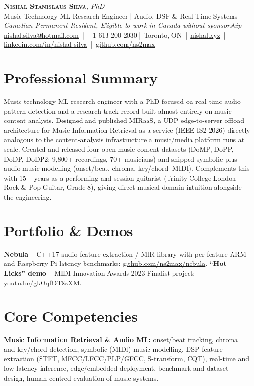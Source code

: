 \documentclass[11pt]{article}
\makeatletter
\newcommand{\cvName}{Nishal Stanislaus Silva}
\newcommand{\cvEmail}{nishal.silva@hotmail.com}
\newcommand{\cvPhone}{+1 613 200 2030}
\newcommand{\cvCity}{Toronto, ON}
\newcommand{\cvSite}{https://nishal.xyz}
\newcommand{\cvLinkedIn}{https://www.linkedin.com/in/nishal-silva}
\newcommand{\cvGitHub}{https://github.com/ns2max}
\newcommand{\cvStatus}{Canadian Permanent Resident, Eligible to work in Canada without sponsorship}
\newcommand{\cvTagline}{Music Technology ML Research Engineer | Audio, DSP \& Real-Time Systems}
\makeatother
\begin{document}
\pagestyle{empty}
\begin{center}
    {\LARGE \scshape \textbf{\cvName}}{\large \textit{, PhD}}\\[1pt]
    {\small \cvTagline}\\[1pt]
    {\footnotesize\textit{\cvStatus}}\\[1pt]
    {\small
    \href{mailto:\cvEmail}{\cvEmail} \,|\, \cvPhone \,|\, \cvCity
    \,|\, \href{\cvSite}{nishal.xyz} \,|\, \href{\cvLinkedIn}{linkedin.com/in/nishal-silva}
    \,|\, \href{\cvGitHub}{github.com/ns2max}}
\end{center}

\section*{Professional Summary}
Music technology ML research engineer with a PhD focused on real-time audio pattern detection and a research track record built almost entirely on music-content analysis. Designed and published MIRaaS, a UDP edge-to-server offload architecture for Music Information Retrieval as a service (IEEE IS2 2026) directly analogous to the content-analysis infrastructure a music/media platform runs at scale. Created and released four open music-content datasets (DoMP, DoPP, DoDP, DoDP2; 9,800+ recordings, 70+ musicians) and shipped symbolic-plus-audio music modelling (onset/beat, chroma, key/chord, MIDI). Complements this with 15+ years as a performing and session guitarist (Trinity College London Rock \& Pop Guitar, Grade 8), giving direct musical-domain intuition alongside the engineering.

\section*{Portfolio \& Demos}
\textbf{Nebula} -- C++17 audio-feature-extraction / MIR library with per-feature ARM and Raspberry Pi latency benchmarks: \href{https://github.com/ns2max/nebula}{github.com/ns2max/nebula}. \textbf{``Hot Licks'' demo} -- MIDI Innovation Awards 2023 Finalist project: \href{https://youtu.be/gkOqfOT8zXM}{youtu.be/gkOqfOT8zXM}.

\section*{Core Competencies}
\textbf{Music Information Retrieval \& Audio ML:} onset/beat tracking, chroma and key/chord detection, symbolic (MIDI) music modelling, DSP feature extraction (STFT, MFCC/LFCC/PLP/GFCC, S-transform, CQT), real-time and low-latency inference, edge/embedded deployment, benchmark and dataset design, human-centred evaluation of music systems.
\end{document}
